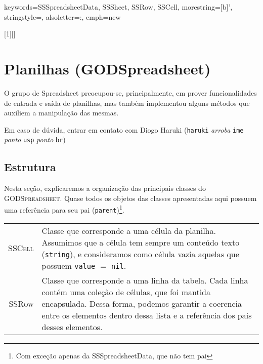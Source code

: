 {

\def\godss{\textsc{GODSpreadsheet}}

\def\classe#1{\textsc{#1}}
\def\code#1{\texttt{#1}}


%

  {keywords={SSSpreadsheetData, SSSheet, SSRow, SSCell},
  morestring=[b]{'},
  stringstyle=\color{purple},
  alsoletter={:}, 
  emph={new}
  }


[1][]
{
\lstset{language=GODSpreadsheet,
    #1}
}
{}


\section{Planilhas (GODSpreadsheet)}

O grupo de Spreadsheet preocupou-se, principalmente, em prover
funcionalidades de entrada e saída de planilhas, mas também implementou
alguns métodos que auxiliem a manipulação das mesmas.

Em caso de dúvida, entrar em contato com Diogo Haruki (\texttt{haruki} \textit{arroba} \texttt{ime} \textit{ponto} \texttt{usp} \textit{ponto} \texttt{br})

\subsection{Estrutura}
Nesta seção, explicaremos a organização das principais classes do
\godss. Quase todos os objetos das classes apresentadas
aqui possuem uma referência para seu pai (\code{parent})\footnote{Com
exceção apenas da SSSpreadsheetData, que não tem pai}.

\begin{tabular}{r p{}}
\classe{SSCell} &  Classe que corresponde a uma célula da planilha.
Assumimos que a célula tem sempre um conteúdo texto (\code{string}), e
consideramos como célula vazia aquelas que possuem \code{value} $=$
\texttt{nil}.\\

\classe{SSRow} & Classe que corresponde a uma linha da tabela.
Cada linha contém uma coleção de células, que foi mantida encapsulada.
Dessa forma, podemos garantir a coerencia entre os elementos dentro dessa
lista e a referência dos pais desses elementos.\\


\end{tabular}}

